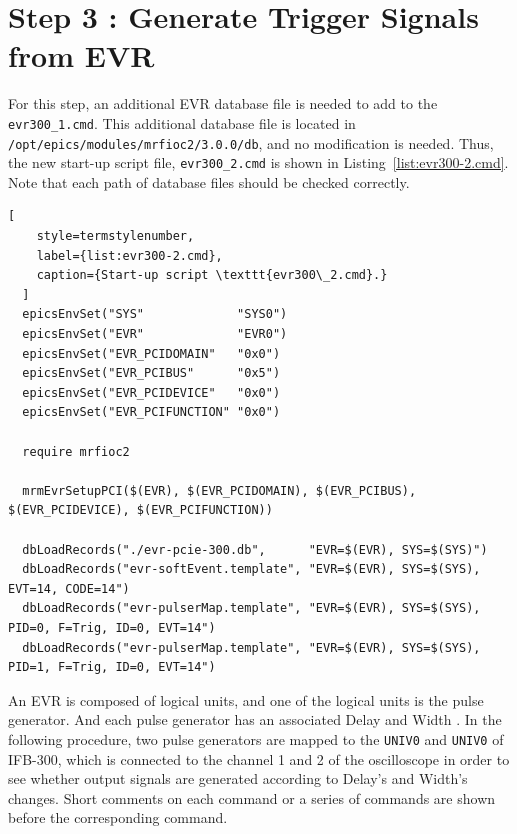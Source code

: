 \documentclass[11pt
  , a4paper
  , article
  , oneside
  , showtrims
]{memoir}
\begin{document}
\section{Step 3 : Generate Trigger Signals from EVR}
For this step, an additional EVR database file is needed to add to the \texttt{evr300\_1.cmd}. This additional database file is located in
\texttt{/opt/epics/modules/mrfioc2/3.0.0/db}, and no modification is needed. Thus, the new start-up script file, \texttt{evr300\_2.cmd} is shown in Listing~\ref{list:evr300-2.cmd}. Note that each path of database files should be checked correctly. 
\begin{lstlisting}[ 
    style=termstylenumber,
    label={list:evr300-2.cmd},
    caption={Start-up script \texttt{evr300\_2.cmd}.}
  ]
  epicsEnvSet("SYS"             "SYS0")
  epicsEnvSet("EVR"             "EVR0")
  epicsEnvSet("EVR_PCIDOMAIN"   "0x0")
  epicsEnvSet("EVR_PCIBUS"      "0x5")
  epicsEnvSet("EVR_PCIDEVICE"   "0x0")
  epicsEnvSet("EVR_PCIFUNCTION" "0x0")
  
  require mrfioc2
  
  mrmEvrSetupPCI($(EVR), $(EVR_PCIDOMAIN), $(EVR_PCIBUS), $(EVR_PCIDEVICE), $(EVR_PCIFUNCTION))
  
  dbLoadRecords("./evr-pcie-300.db",      "EVR=$(EVR), SYS=$(SYS)")
  dbLoadRecords("evr-softEvent.template", "EVR=$(EVR), SYS=$(SYS), EVT=14, CODE=14") 
  dbLoadRecords("evr-pulserMap.template", "EVR=$(EVR), SYS=$(SYS), PID=0, F=Trig, ID=0, EVT=14")
  dbLoadRecords("evr-pulserMap.template", "EVR=$(EVR), SYS=$(SYS), PID=1, F=Trig, ID=0, EVT=14")
\end{lstlisting}

An EVR is composed of logical units, and one of the logical units is the pulse generator. And each pulse generator has an associated Delay and Width \cite{EVR-USER-GUIDE}. In the following procedure, two pulse generators are mapped to the \texttt{UNIV0} and \texttt{UNIV0} of IFB-300, which is connected to the channel 1 and 2 of the oscilloscope in order to see whether output signals are generated according to Delay's and Width's changes. Short comments on each command or a series of commands are shown before the corresponding command.
\end{document}
